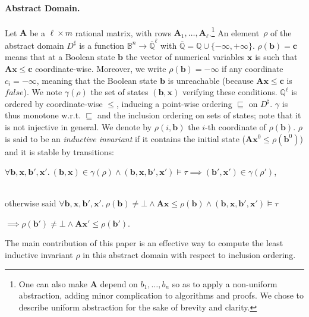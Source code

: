 \documentclass{llncs}
\newcommand{\pponly}[1]{}
\newcommand{\rronly}[1]{#1}
\newcommand{\BB}{\mathbb{B}}
\newcommand{\QQ}{\mathbb{Q}}
\newcommand{\sleq}{\!\leq\!}
\newcommand{\abstr}[1]{#1^\sharp}
\newcommand{\mat}[1]{{\boldsymbol #1}}
\renewcommand{\vec}[1]{{\boldsymbol #1}}
\begin{document}
\paragraph*{Abstract Domain.}
Let $\mat{A}$ be a $\ell \times m$ rational matrix, with rows
$\mat{A}_1,\dots,\mat{A}_\ell$.\rronly{\footnote{One can also make $\mat{A}$ depend on $b_1,\dots,b_n$ so as
  to apply a non-uniform abstraction, adding minor complication to
  algorithms and proofs. We chose to describe uniform abstraction for
  the sake of brevity and
  clarity.}} 
An element~$\rho$ of the abstract domain $\abstr{D}$ is a function
$\BB^n \rightarrow \overline{\QQ}^\ell$ with $\overline{\QQ} = \QQ \cup \{
-\infty, +\infty \}$. $\rho(\vec{b}) =\vec{c}$ means that 
at a Boolean state $\vec{b}$ the vector of numerical variables $\vec{x}$ is such
that $\mat{A}\vec{x} \sleq \vec{c}$ coordinate-wise.
Moreover, we write $\rho(\vec{b}){=}-\vec{\infty}$ if 
any coordinate $c_i{=}-\infty$, meaning that the Boolean state $\vec{b}$ is
unreachable (because $\mat{A}\vec{x} \sleq \vec{c}$ is $\mathit{false}$). We note
$\gamma(\rho)$ the set of states $(\vec{b},\vec{x})$ verifying these
conditions.  $\QQ^\ell$ is ordered by
coordinate-wise $\leq$, inducing a point-wise ordering $\sqsubseteq$
on $\abstr{D}$. $\gamma$ is thus monotone w.r.t.
$\sqsubseteq$ and the inclusion ordering on sets of states\rronly{; note that
it is not injective in general}.  We denote by $\rho(i,\vec{b})$ the
$i$-th coordinate of $\rho(\vec{b})$.
$\rho$ is said to be an \emph{inductive invariant} if it contains the initial state ($\mat{A}\vec{x}^0 \leq \rho(\vec{b}^0)$) and it is stable by transitions:\\
\centerline{$\forall \vec{b},\vec{x},\vec{b}',\vec{x}'.~ (\vec{b},\vec{x}) \in \gamma(\rho) \land (\vec{b},\vec{x},\vec{b}',\vec{x}') \models \tau \implies (\vec{b}',\vec{x}') \in \gamma(\rho')$,}\rronly{\\
otherwise said
$\forall \vec{b},\vec{x},\vec{b}',\vec{x}'.~ \rho(\vec{b}) \neq \bot \land \mat{A}\vec{x} \leq \rho(\vec{b})\land (\vec{b},\vec{x},\vec{b}',\vec{x}') \models\tau$\\
\centerline{$\implies \rho(\vec{b}') \neq \bot \land \mat{A}\vec{x}' \leq \rho(\vec{b}')$.}}

The main contribution of this paper is an effective way to compute the
least inductive invariant $\rho$ in this abstract
domain\pponly{ w.r.t. $\sqsubseteq$}\rronly{ with
  respect to inclusion ordering}.
\end{document}
